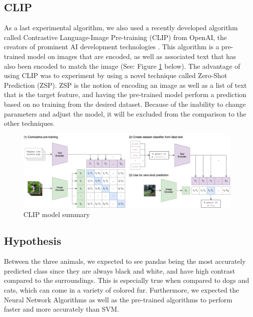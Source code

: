 \subsection{CLIP}
As a last experimental algorithm, we also used a recently developed algorithm called Contrastive Language-Image Pre-training (CLIP) from OpenAI, the creators of prominent AI development technologies \cite{CLIP}.
This algorithm is a pre-trained model on images that are encoded, as well as associated text that has also been encoded to match the image (See: Figure \ref{fig:figure1} below).
The advantage of using CLIP was to experiment by using a novel technique called Zero-Shot Prediction (ZSP).
ZSP is the notion of encoding an image as well as a list of text that is the target feature, and having the pre-trained model perform a prediction based on no training from the desired dataset.
Because of the inability to change parameters and adjust the model, it will be excluded from the comparison to the other techniques.

\begin{figure}[h]
	\centering
	\includegraphics[scale=0.5]{CLIP_structure}
	\caption{CLIP model summary}
	\label{fig:figure1}
\end{figure}

\subsection{Hypothesis}
Between the three animals, we expected to see pandas being the most accurately predicted class since they are always black and white, and have high contrast compared to the surroundings.
This is especially true when compared to dogs and cats, which can come in a variety of colored fur.
Furthermore, we expected the Neural Network Algorithms as well as the pre-trained algorithms to perform faster and more accurately than SVM.